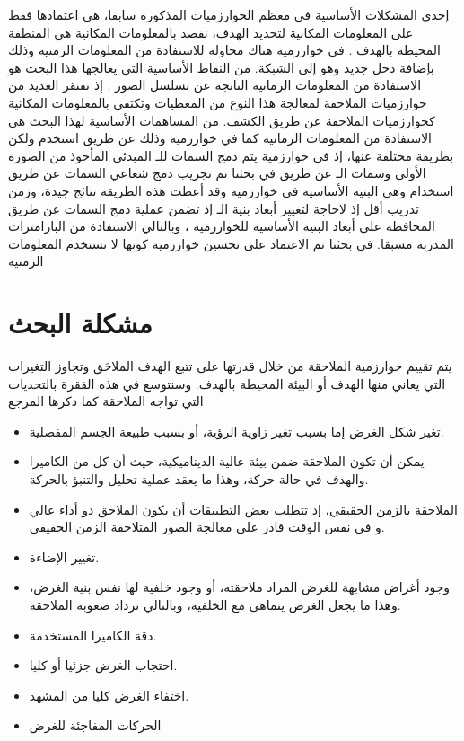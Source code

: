 \documentclass[a4paper,1  pt]{report}
\begin{document}
إحدى المشكلات الأساسية في معظم الخوارزميات المذكورة سابقا، هي اعتمادها فقط على المعلومات المكانية لتحديد الهدف، نقصد بالمعلومات المكانية هي المنطقة المحيطة بالهدف
.
في خوارزمية
هناك محاولة للاستفادة من المعلومات الزمنية وذلك بإضافة دخل جديد وهو
إلى الشبكة.
من النقاط الأساسية التي يعالجها هذا البحث هو الاستفادة من المعلومات الزمانية 
الناتجة عن تسلسل الصور . إذ تفتقر العديد من خوارزميات الملاحقة لمعالجة هذا النوع من المعطيات وتكتفي بالمعلومات المكانية
كخوارزميات الملاحقة عن طريق الكشف.
\newline{}
من المساهمات الأساسية لهذا البحث هي الاستفادة من المعلومات الزمانية كما في خوارزمية 
وذلك عن طريق استخدم
ولكن بطريقة مختلفة عنها، إذ في خوارزمية
يتم دمج السمات للـ
المبدئي المأخوذ من الصورة الأولى وسمات الـ 
عن طريق
في بحثنا تم تجريب دمج شعاعي السمات عن طريق استخدام
وهي البنية الأساسية في خوارزمية
وقد أعطت هذه الطريقة نتائج جيدة، وزمن تدريب أقل إذ لاحاجة لتغيير أبعاد بنية الـ 
إذ تضمن عملية دمج السمات عن طريق 
المحافظة على أبعاد البنية الأساسية للخوارزمية ، وبالتالي الاستفادة من البارامترات المدربة مسبقا.
في بحثنا تم الاعتماد على تحسين خوارزمية 
كونها لا تستخدم المعلومات الزمنية
\section{مشكلة البحث}
يتم تقييم خوارزمية الملاحقة من خلال قدرتها على تتبع الهدف الملاحَق وتجاوز التغيرات التي يعاني منها الهدف أو البيئة المحيطة بالهدف. وسنتوسع في هذه الفقرة بالتحديات التي تواجه الملاحقة كما ذكرها المرجع
\cite{Abbass21}
\begin{itemize}
  \item
   تغير شكل الغرض إما بسبب تغير زاوية الرؤية، أو بسبب طبيعة الجسم المفصلية.
  \item
  يمكن أن تكون الملاحقة ضمن بيئة عالية الديناميكية، حيث أن كل من الكاميرا والهدف في حالة حركة، وهذا ما يعقد عملية تحليل والتنبؤ بالحركة.
  \item
  الملاحقة بالزمن الحقيقي، إذ تتطلب بعض التطبيقات أن يكون الملاحق ذو أداء عالي و في نفس الوقت قادر على معالجة الصور المتلاحقة الزمن الحقيقي.
  \item
  تغيير الإضاءة.
  \item
  وجود أغراض مشابهة للغرض المراد ملاحقته، أو وجود خلفية لها نفس بنية الغرض، وهذا ما يجعل الغرض يتماهى مع الخلفية، وبالتالي تزداد صعوبة الملاحقة.
  \item
  دقة الكاميرا المستخدمة.
  \item
  احتجاب الغرض  جزئيا أو كليا.
  \item
  اختفاء الغرض كليا من المشهد.
  \item
  الحركات المفاجئة للغرض
\end{itemize}
\end{document}
